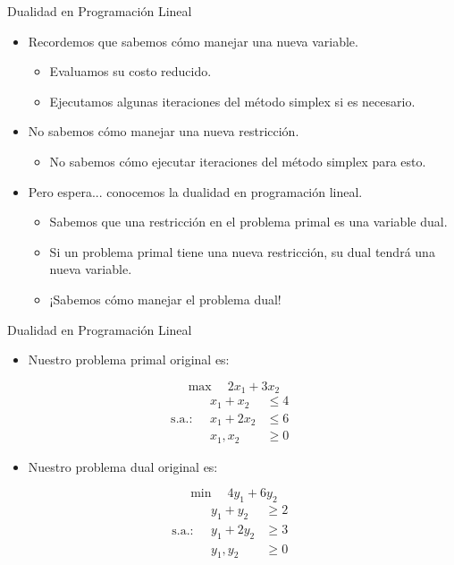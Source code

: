 \documentclass{beamer}
\begin{document}
\begin{frame}{Dualidad en Programación Lineal}
    \begin{itemize}
        \item Recordemos que sabemos cómo manejar una nueva variable.
        \begin{itemize}
            \item Evaluamos su costo reducido.
            \item Ejecutamos algunas iteraciones del método simplex si es necesario.
        \end{itemize}

        \item No sabemos cómo manejar una nueva restricción.
        \begin{itemize}
            \item No sabemos cómo ejecutar iteraciones del método simplex para esto.
        \end{itemize}

        \item Pero espera... conocemos la dualidad en programación lineal.
        \begin{itemize}
            \item Sabemos que una restricción en el problema primal es una variable dual.
            \item Si un problema primal tiene una nueva restricción, su dual tendrá una nueva variable.
            \item ¡Sabemos cómo manejar el problema dual!
        \end{itemize}
    \end{itemize}
\end{frame}

\begin{frame}{Dualidad en Programación Lineal}
    \begin{itemize}
        \item Nuestro problema primal original es:
    \end{itemize}

    \[
    \max \quad 2x_1 + 3x_2
    \]
    \[
    \text{s.a.:} \quad
    \begin{aligned}
        x_1 + x_2 &\leq 4 \\
        x_1 + 2x_2 &\leq 6 \\
        x_1, x_2 &\geq 0
    \end{aligned}
    \]

    \vspace{0.5cm}

    \begin{itemize}
        \item Nuestro problema dual original es:
    \end{itemize}

    \[
    \min \quad 4y_1 + 6y_2
    \]
    \[
    \text{s.a.:} \quad
    \begin{aligned}
        y_1 + y_2 &\geq 2 \\
        y_1 + 2y_2 &\geq 3 \\
        y_1, y_2 &\geq 0
    \end{aligned}
    \]
\end{frame}
\end{document}
